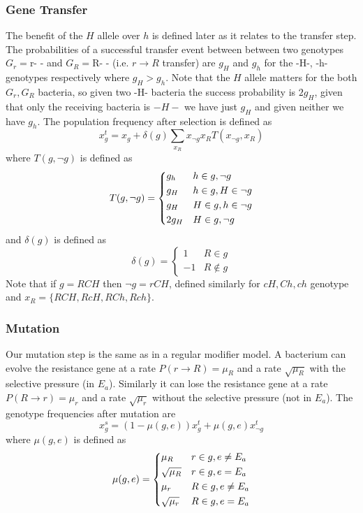 \subsubsection{Gene Transfer}
The benefit of the $H$ allele over $h$ is defined later as it relates to the transfer step.
The probabilities of a successful transfer event between between two genotypes $G_r=$r- - and $G_R=$R- - (i.e. $r \to R$ transfer) are $g_H$ and $g_h$ for the -H-, -h- genotypes respectively where $g_H > g_h$.
Note that the $H$ allele matters for the both $G_r,G_R$ bacteria, so given two -H- bacteria the success probability is $2g_H$, given that only the receiving bacteria is $-H-$ we have just $g_H$ and given neither we have $g_h$.
The population frequency after selection is defined as
$$x_g^t = x_g + \delta(g)\sum_{x_R} x_{\neg g}x_R T(x_{\neg g},x_R)$$
where $T(g,\neg g)$ is defined as
\[T(g, \neg g) = \begin{dcases}
                     g_h & h \in g,\neg g \\
                     g_H & h \in g, H \in \neg g  \\
                     g_H & H \in g, h \in \neg g  \\
                    2g_H & H \in g,\neg g
                 \end{dcases}\]
and $\delta(g)$ is defined as
$$\delta(g) = \begin{cases} 1 & R \in g \\ -1 & R \notin g\end{cases}$$
Note that if $g=RCH$ then $\neg g=rCH$, defined similarly for $cH,Ch,ch$ genotype and $x_R = \{RCH,RcH,RCh,Rch\}$.

\subsubsection{Mutation}
Our mutation step is the same as in a regular modifier model.
A bacterium can evolve the resistance gene at a rate $P(r\to R) = \mu_R$ and a rate $\sqrt{\mu_R}$ with the selective pressure (in $E_a$).
Similarly it can lose the resistance gene at a rate $P(R\to r) =\mu_r$ and a rate $\sqrt{\mu_r}$ without the selective pressure (not in $E_a$).
The genotype frequencies after mutation are
$$x_g^s = (1-\mu(g,e))x_g^t + \mu(g,e)x_{\neg g}^t$$
where $\mu(g,e)$ is defined as
\[\mu(g,e) = \begin{dcases}
           \mu_R & r \in g, e \neq E_a \\
    \sqrt{\mu_R} & r \in g, e = E_a \\
           \mu_r & R \in g, e \neq E_a \\
    \sqrt{\mu_r} & R \in g, e = E_a \\
          \end{dcases}\]

